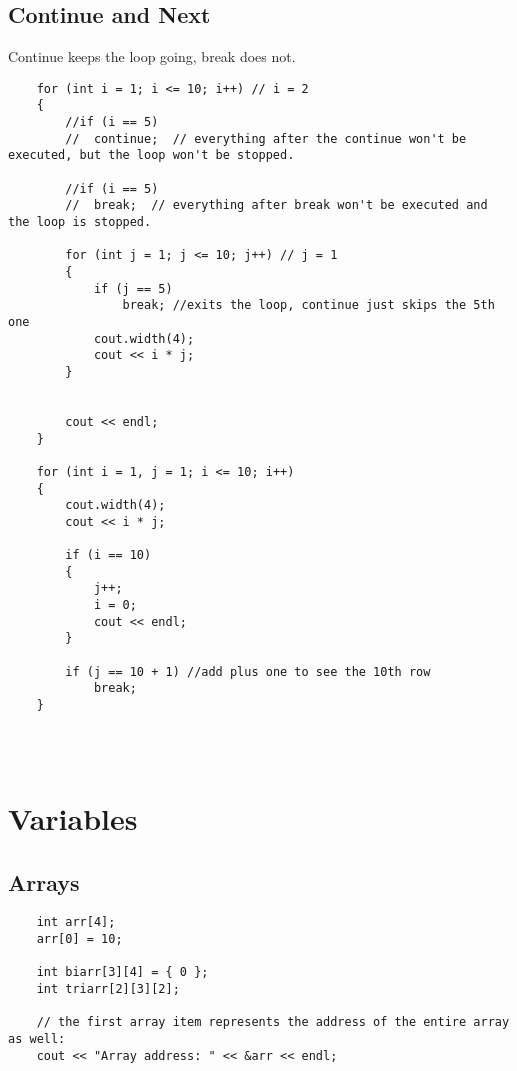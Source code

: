 \documentclass{article}
\begin{document}
\subsection{Continue and Next}
Continue keeps the loop going, break does not.
\begin{lstlisting}	
	for (int i = 1; i <= 10; i++) // i = 2
	{
		//if (i == 5)
		//	continue;  // everything after the continue won't be executed, but the loop won't be stopped.

		//if (i == 5)
		//	break;  // everything after break won't be executed and the loop is stopped.

		for (int j = 1; j <= 10; j++) // j = 1
		{
			if (j == 5)
				break; //exits the loop, continue just skips the 5th one
			cout.width(4);
			cout << i * j;
		}


		cout << endl;
	}

	for (int i = 1, j = 1; i <= 10; i++)
	{
		cout.width(4);
		cout << i * j;

		if (i == 10)
		{
			j++;
			i = 0;
			cout << endl;
		}

		if (j == 10 + 1) //add plus one to see the 10th row
			break;
	}


\end{lstlisting}




\subsection{}

\begin{lstlisting}

\end{lstlisting}






\section{Variables}
\subsection{Arrays}
\begin{lstlisting}
	int arr[4];
	arr[0] = 10;

	int biarr[3][4] = { 0 };
	int triarr[2][3][2];

	// the first array item represents the address of the entire array as well:
	cout << "Array address: " << &arr << endl;
	
	
\end{lstlisting}
\end{document}
